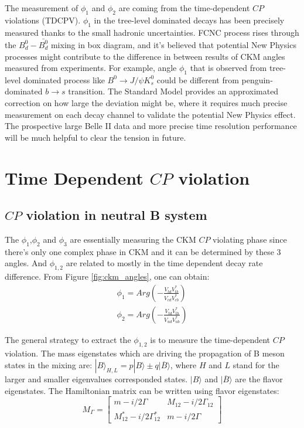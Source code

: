 The measurement of $\phi_1$ and $\phi_2$ are coming from the time-dependent $CP$ violations (TDCPV). $\phi_1$ in the tree-level dominated decays has been precisely measured thanks to the small hadronic uncertainties. FCNC process rises through the $B^0_d-\bar{B^0_d}$ mixing in box diagram, and it's believed that potential New Physics processes might contribute to the difference in between results of CKM angles measured from experiments. For example, angle $\phi_1$ that is observed from tree-level dominated process like $B^0 \to J/\psi K^0_s$ could be different from penguin-dominated $b \to s$ transition. The Standard Model provides an approximated correction on how large the deviation might be, where it requires much precise measurement on each decay channel to validate the potential New Physics effect. The prospective large Belle II data and more precise time resolution performance will be much helpful to clear the tension in future. 

\section{Time Dependent $CP$ violation}
\subsection{ $CP$ violation in neutral B system}
The  $\phi_1$,$\phi_2$ and $\phi_3$ are essentially measuring the CKM $CP$ violating phase since there's only one complex phase in CKM and it can be determined by these 3 angles. And $\phi_{1,2}$ are related to mostly in the time dependent decay rate difference. From Figure \ref{fig:ckm_angles}, one can obtain: 
\begin{eqnarray}
\phi_1=Arg(-\frac{V_{td}V^*_{tb}}{V_{cd}V^*_{cb}})\\
\phi_2=Arg(-\frac{V_{td}V^*_{tb}}{V_{ud}V^*_{ub}})
\end{eqnarray}

The general strategy to extract the $\phi_{1,2}$ is to measure the time-dependent $CP$ violation.
The mass eigenstates which are driving the propagation of B meson states in the mixing are: $|B\rangle_{H,L}=p|B\rangle \pm q|\overline{B}\rangle $, where $H$ and $L$ stand for the larger and smaller eigenvalues corresponded states. $|B\rangle$ and $|\overline{B}\rangle$ are the flavor eigenstates.
The Hamiltonian matrix can be written using flavor eigenstates: 
\begin{equation}
M_\Gamma=
\begin{bmatrix}
m-i/2\Gamma & M_{12}-i/2\Gamma_{12}\\
M^*_{12}-i/2\Gamma^*_{12}& m-i/2\Gamma 
\end{bmatrix}
\end{equation}

